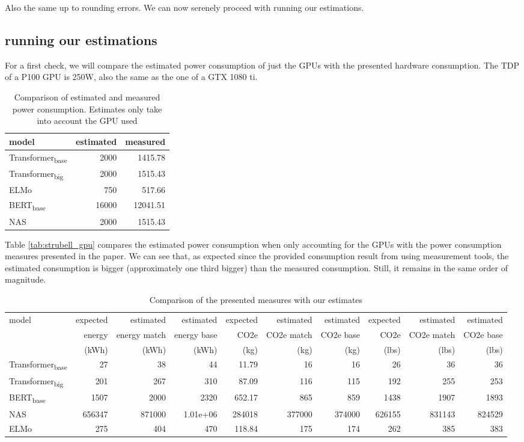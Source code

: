 \documentclass[11pt]{article}
\begin{document}
Also the same up to rounding errors. We can now serenely proceed with
running our estimations.

\subsection{running our estimations}
\label{sec:org6a59a03}

For a first check, we will compare the estimated power consumption of
just the GPUs with the presented hardware consumption. The \gls{TDP} of a
P100 GPU is 250W, also the same as the one of a GTX 1080 ti.


\begin{table}[htbp]
\caption{Comparison of estimated and measured power consumption. Estimates only take into account the GPU used}
\centering
\begin{tabular}{lrr}
model & estimated & measured\\
\hline
Transformer\textsubscript{base} & 2000 & 1415.78\\
Transformer\textsubscript{big} & 2000 & 1515.43\\
ELMo & 750 & 517.66\\
BERT\textsubscript{base} & 16000 & 12041.51\\
NAS & 2000 & 1515.43\\
\end{tabular}
\end{table}

Table \ref{tab:strubell_gpu} compares the estimated power consumption
when only accounting for the GPUs with the power consumption measures
presented in the paper. We can see that, as expected since the provided consumption result
from using measurement tools, the estimated consumption is bigger
(approximately one third bigger) than
the measured consumption. Still, it remains in the same order of
magnitude.

\begin{table}[htbp]
\caption{Comparison of the presented measures with our estimates}
\centering
\begin{tabular}{lrrrrrrrrr}
model & expected & estimated & estimated & expected & estimated & estimated & expected & estimated & estimated\\
 & energy & energy match & energy base & CO2e & CO2e match & CO2e base & CO2e & CO2e match & CO2e base\\
 & (kWh) & (kWh) & (kWh) & (kg) & (kg) & (kg) & (lbs) & (lbs) & (lbs)\\
\hline
Transformer\textsubscript{base} & 27 & 38 & 44 & 11.79 & 16 & 16 & 26 & 36 & 36\\
Transformer\textsubscript{big} & 201 & 267 & 310 & 87.09 & 116 & 115 & 192 & 255 & 253\\
BERT\textsubscript{base} & 1507 & 2000 & 2320 & 652.17 & 865 & 859 & 1438 & 1907 & 1893\\
NAS & 656347 & 871000 & 1.01e+06 & 284018 & 377000 & 374000 & 626155 & 831143 & 824529\\
ELMo & 275 & 404 & 470 & 118.84 & 175 & 174 & 262 & 385 & 383\\
\end{tabular}
\end{table}
\end{document}
